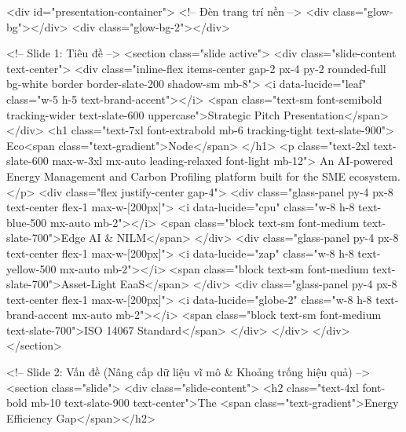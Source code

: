     <div id="presentation-container">
        <!-- Đèn trang trí nền -->
        <div class="glow-bg"></div>
        <div class="glow-bg-2"></div>

        <!-- Slide 1: Tiêu đề -->
        <section class="slide active">
            <div class="slide-content text-center">
                <div class="inline-flex items-center gap-2 px-4 py-2 rounded-full bg-white border border-slate-200 shadow-sm mb-8">
                    <i data-lucide="leaf" class="w-5 h-5 text-brand-accent"></i>
                    <span class="text-sm font-semibold tracking-wider text-slate-600 uppercase">Strategic Pitch Presentation</span>
                </div>
                <h1 class="text-7xl font-extrabold mb-6 tracking-tight text-slate-900">
                    Eco<span class="text-gradient">Node</span>
                </h1>
                <p class="text-2xl text-slate-600 max-w-3xl mx-auto leading-relaxed font-light mb-12">
                    An AI-powered Energy Management and Carbon Profiling platform built for the SME ecosystem.
                </p>
                <div class="flex justify-center gap-4">
                    <div class="glass-panel py-4 px-8 text-center flex-1 max-w-[200px]">
                        <i data-lucide="cpu" class="w-8 h-8 text-blue-500 mx-auto mb-2"></i>
                        <span class="block text-sm font-medium text-slate-700">Edge AI & NILM</span>
                    </div>
                    <div class="glass-panel py-4 px-8 text-center flex-1 max-w-[200px]">
                        <i data-lucide="zap" class="w-8 h-8 text-yellow-500 mx-auto mb-2"></i>
                        <span class="block text-sm font-medium text-slate-700">Asset-Light EaaS</span>
                    </div>
                    <div class="glass-panel py-4 px-8 text-center flex-1 max-w-[200px]">
                        <i data-lucide="globe-2" class="w-8 h-8 text-brand-accent mx-auto mb-2"></i>
                        <span class="block text-sm font-medium text-slate-700">ISO 14067 Standard</span>
                    </div>
                </div>
            </div>
        </section>

        <!-- Slide 2: Vấn đề (Nâng cấp dữ liệu vĩ mô & Khoảng trống hiệu quả) -->
        <section class="slide">
            <div class="slide-content">
                <h2 class="text-4xl font-bold mb-10 text-slate-900 text-center">The <span class="text-gradient">Energy Efficiency Gap</span></h2>
                
